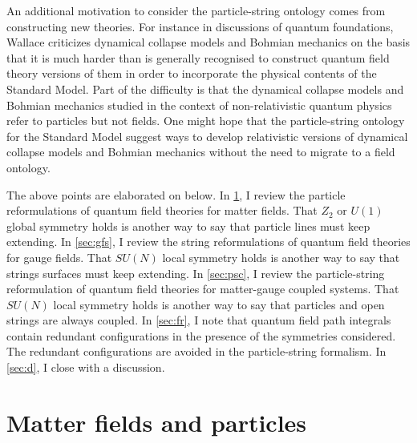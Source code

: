 \documentclass[12pt]{article}
\theoremstyle{definition}
\begin{document}
An additional motivation to consider the particle-string ontology comes from constructing new theories. For instance in discussions of quantum foundations, Wallace \cite{Wallace2020OnProblem} criticizes dynamical collapse models and Bohmian mechanics on the basis that it is much harder than is generally recognised to construct quantum field theory versions of them in order to incorporate the physical contents of the Standard Model. Part of the difficulty is that the dynamical collapse models and Bohmian mechanics studied in the context of non-relativistic quantum physics refer to particles but not fields. One might hope that the particle-string ontology for the Standard Model suggest ways to develop relativistic versions of dynamical collapse models and Bohmian mechanics without the need to migrate to a field ontology.

The above points are elaborated on below. In \cref{sec:sfp}, I review the particle reformulations of quantum field theories for matter fields. That $Z_2$ or $U(1)$ global symmetry holds is another way to say that particle lines must keep extending. In \cref{sec:gfs}, I review the string reformulations of quantum field theories for gauge fields. That $SU(N)$ local symmetry holds is another way to say that strings surfaces must keep extending. In \cref{sec:psc}, I review the particle-string reformulation of quantum field theories for matter-gauge coupled systems. That $SU(N)$ local symmetry holds is another way to say that particles and open strings are always coupled. In \cref{sec:fr}, I note that quantum field path integrals contain redundant configurations in the presence of the symmetries considered. The redundant configurations are avoided in the particle-string formalism. In \cref{sec:d}, I close with a discussion.

\section{Matter fields and particles}\label{sec:sfp}


\end{document}
